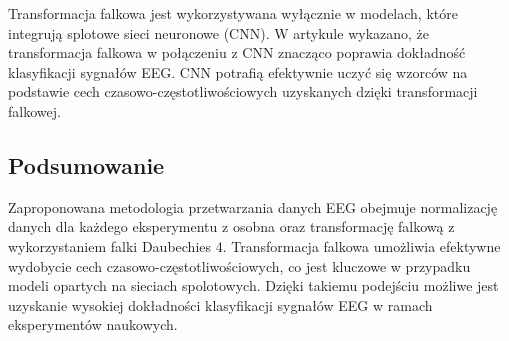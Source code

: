 \documentclass[eeg_v4.tex]{subfiles}
\begin{document}
    Transformacja falkowa jest wykorzystywana wyłącznie w modelach, które integrują splotowe sieci neuronowe (CNN). W
    artykule \cite{rajwal2023}
    wykazano, że transformacja falkowa w połączeniu z CNN znacząco poprawia dokładność klasyfikacji sygnałów EEG. CNN
    potrafią efektywnie uczyć się wzorców na podstawie cech czasowo-częstotliwościowych uzyskanych dzięki transformacji
    falkowej.

    \subsection{Podsumowanie}

    Zaproponowana metodologia przetwarzania danych EEG obejmuje normalizację danych dla każdego eksperymentu z osobna
    oraz transformację falkową z wykorzystaniem falki Daubechies 4. Transformacja falkowa umożliwia efektywne wydobycie
    cech czasowo-częstotliwościowych, co jest kluczowe w przypadku modeli opartych na sieciach spolotowych. Dzięki
    takiemu podejściu możliwe jest uzyskanie wysokiej dokładności klasyfikacji sygnałów EEG w ramach eksperymentów
    naukowych.
\end{document}
